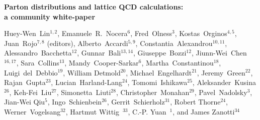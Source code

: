 \documentclass[twoside,12pt]{article}
\numberwithin{equation}{section}
\numberwithin{figure}{section}
\numberwithin{table}{section}
\begin{document}
\vspace{.3cm}

\begin{center}
{\Large \bf Parton distributions and lattice QCD calculations:\\[0.2cm] a community white-paper}
\vspace{.4cm}

{\small 
  Huey-Wen~Lin$^{1,2}$,
  Emanuele~R.~Nocera$^6$,
  Fred~Olness$^3$,
  Kostas~Orginos$^{4,5}$,
  Juan~Rojo$^{7,8}$ (editors),
Alberto~Accardi$^{5,9}$, 
Constantia~Alexandrou$^{10,11}$, 
Alessandro~Bacchetta$^{12}$, 
Gunnar~Bali$^{13,14}$, 
Giuseppe~Bozzi$^{12}$, 
Jiunn-Wei~Chen$^{16,17}$, 	
Sara~Collins$^{13}$, 	
Mandy~Cooper-Sarkar$^{6}$, 
Martha~Constantinou$^{18}$, 
Luigi~del~Debbio$^{19}$, 
William Detmold$^{20}$, 
Michael~Engelhardt$^{21}$, 
Jeremy~Green$^{22}$, 
Rajan~Gupta$^{23}$, 
Lucian~Harland-Lang$^{24}$, 
Tomomi~Ishikawa$^{25}$, 
Aleksander~Kusina$^{26}$, 
Keh-Fei~Liu$^{27}$, 	
Simonetta~Liuti$^{28}$, 		
Christopher~Monahan$^{29}$, 		
Pavel~Nadolsky$^{3}$,
Jian-Wei Qiu$^{5}$,
Ingo~Schienbein$^{26}$, 	
Gerrit~Schierholz$^{31}$,
Robert Thorne$^{24}$,
Werner~Vogelsang$^{32}$,
Hartmut Wittig~$^{33}$, 
C.-P. Yuan~$^{1}$, and
James Zanotti$^{34}$
}


\end{center}
\end{document}
